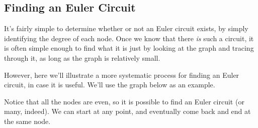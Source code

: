\subsection{Finding an Euler Circuit}
It's fairly simple to determine whether or not an Euler circuit exists, by simply identifying the degree of each node.  Once we know that there \emph{is} such a circuit, it is often simple enough to find what it is just by looking at the graph and tracing through it, as long as the graph is relatively small.

However, here we'll illustrate a more systematic process for finding an Euler circuit, in case it is useful.  We'll use the graph below as an example.
\begin{center}
\end{center}

Notice that all the nodes are even, so it is possible to find an Euler circuit (or many, indeed).  We can start at any point, and eventually come back and end at the same node.

